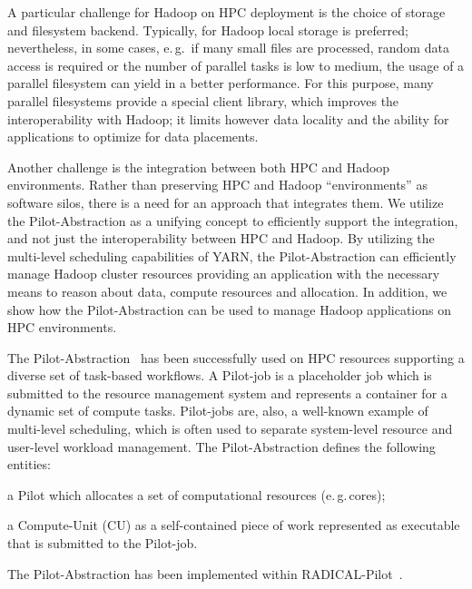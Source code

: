 A particular challenge for Hadoop on HPC deployment is the choice of storage and filesystem backend.
Typically, for Hadoop local storage is preferred; nevertheless, in some cases, e.\,g.\ if many small files are processed, random data access is required or the number of parallel tasks is low to medium, the usage of a parallel filesystem can yield in a better performance.
For this purpose, many parallel filesystems provide a special client library, which improves the interoperability with Hadoop; it limits however data locality and the ability for applications to optimize for data placements.

Another challenge is the integration between both HPC and Hadoop environments.
Rather than preserving HPC and Hadoop ``environments'' as software silos, there is a need for an approach that integrates them. 
We utilize the Pilot-Abstraction as a unifying concept to efficiently support the integration, and not just the interoperability between HPC and Hadoop.
By utilizing the multi-level scheduling capabilities of YARN, the Pilot-Abstraction can efficiently manage Hadoop cluster resources providing an application with the necessary means to reason about data, compute resources and allocation.
In addition, we show how the Pilot-Abstraction can be used to manage Hadoop applications on HPC environments.

The Pilot-Abstraction~\cite{luckow2012pstar} has been successfully used on HPC resources supporting a diverse set of task-based workflows.
A Pilot-job is a placeholder job which is submitted to the resource management system and represents a container for a dynamic set of compute tasks.
Pilot-jobs are, also, a well-known example of multi-level scheduling, which is often used to separate system-level resource and user-level workload management.
The Pilot-Abstraction defines the following entities:
\begin{inparaenum} [(i)]
    \item a Pilot which allocates a set of computational resources (e.\,g.\,cores);
    \item  a Compute-Unit (CU) as a self-contained piece of work represented as executable that is submitted to the Pilot-job.
\end{inparaenum}
The Pilot-Abstraction has been implemented within RADICAL-Pilot~\cite{merzky2018design}.


